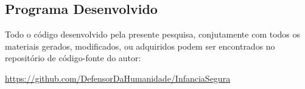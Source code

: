 \begin{apendicesenv}
\hspace{-1.6cm}




\chapter{Programa Desenvolvido}\label{chap:codigo}

Todo o código desenvolvido pela presente pesquisa, conjutamente com todos os materiais gerados, modificados, ou adquiridos podem ser encontrados no repositório de código-fonte do autor:

\url{https://github.com/DefensorDaHumanidade/InfanciaSegura}

\end{apendicesenv}

